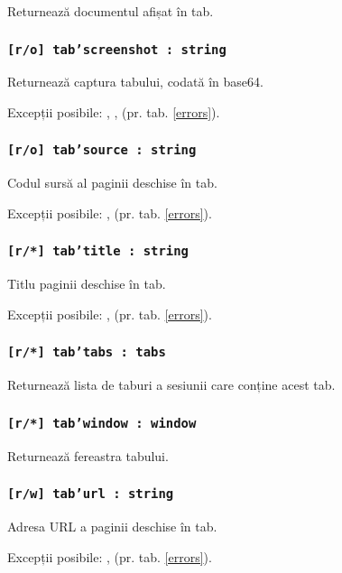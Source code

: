 Returnează documentul afișat în tab.

\subsubsection{\texttt{[r/o] tab'screenshot : string}}

Returnează captura tabului, codată în base64.

Excepții posibile: , ,  (pr. tab. \ref{errors}).

\subsubsection{\texttt{[r/o] tab'source : string}}

Codul sursă al paginii deschise în tab.

Excepții posibile: ,  (pr. tab. \ref{errors}).

\subsubsection{\texttt{[r/*] tab'title : string}}

Titlu paginii deschise în tab.

Excepții posibile: ,  (pr. tab. \ref{errors}).

\subsubsection{\texttt{[r/*] tab'tabs : tabs}}

Returnează lista de taburi a sesiunii care conține acest tab.

\subsubsection{\texttt{[r/*] tab'window : window}}

Returnează fereastra tabului.

\subsubsection{\texttt{[r/w] tab'url : string}}

Adresa URL a paginii deschise în tab.

Excepții posibile: ,  (pr. tab. \ref{errors}).

